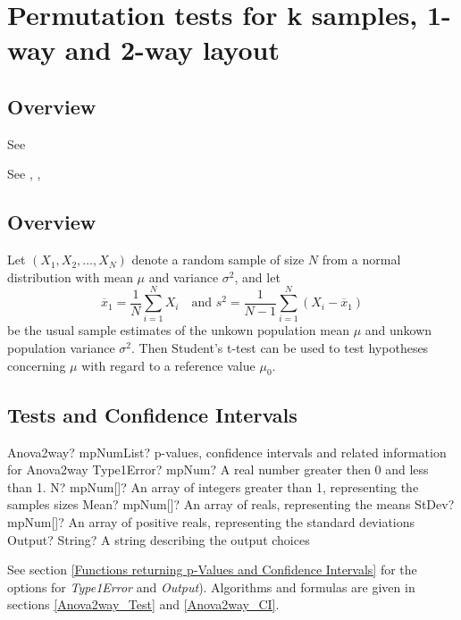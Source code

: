 \newpage
\section{Permutation tests for k samples, 1-way and 2-way layout}

\subsection{Overview}


See \cite{Rasch_2011}

See \cite{kirk_experimental_1982}, \cite{kirk_experimental_1995}, \cite{kirk_experimental_2013}


\subsection{Overview}
\label{Anova2wayOverview}

Let $(X_1, X_2, \ldots, X_N)$ denote a random sample of size $N$ from a normal distribution with mean $\mu$ and variance $\sigma^2$, and let
\begin{equation}
	\overline{x}_1 = \frac{1}{N} \sum_{i=1}^N X_i \quad \text{and } s^2 = \frac{1}{N-1} \sum_{i=1}^N (X_i - \overline{x}_1)
\end{equation}
be the usual sample estimates of the unkown population mean $\mu$ and unkown population variance $\sigma^2$. Then Student's t-test can be used to test hypotheses concerning $\mu$ with regard to a reference value $\mu_0$.



\subsection{Tests and Confidence Intervals}

\begin{mpFunctionsExtract}
	\mpFunctionFiveNotImplemented
	{Anova2way? mpNumList? p-values, confidence intervals and related information for Anova2way}
	{Type1Error? mpNum? A real number greater then 0 and less than 1.}
	{N? mpNum[]? An array of integers greater than 1, representing the samples sizes}
	{Mean? mpNum[]? An array of reals, representing the means}
	{StDev? mpNum[]? An array of positive reals, representing the standard deviations}
	{Output? String? A string describing the output choices}
\end{mpFunctionsExtract}

\vspace{0.3cm}
See section \ref{Functions returning p-Values and Confidence Intervals} for the options for {\itshape\sffamily Type1Error} and {\itshape\sffamily Output}). Algorithms and formulas are given in sections \ref{Anova2way_Test} and \ref{Anova2way_CI}.




